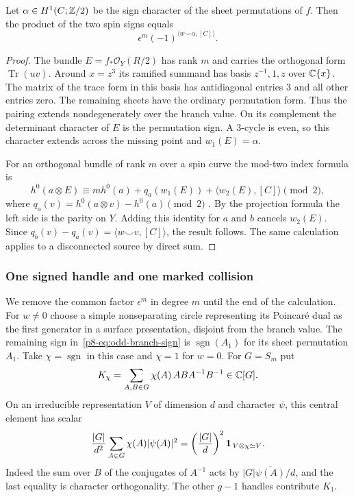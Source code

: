 \begin{lemma}\label{p8-lem:odd-branch-sign}
Let $\alpha\in H^1(C;\mathbb Z/2)$ be the sign character of the sheet
permutations of $f$. Then the product of the two spin signs equals
\begin{equation}
       \epsilon^m(-1)^{\langle w\smile\alpha,[C]\rangle}.
 \label{p8-eq:odd-branch-sign}
\end{equation}
\end{lemma}
\begin{proof}
The bundle $E=f_*\mathcal O_Y(R/2)$ has rank $m$ and carries the
orthogonal form $\operatorname{Tr}(uv)$. Around $x=z^3$ its ramified
summand has basis $z^{-1},1,z$ over $\mathbb C\{x\}$. The matrix of the
trace form in this basis has antidiagonal entries $3$ and all
other entries zero. The remaining sheets have the ordinary
permutation form. Thus the pairing extends nondegenerately over the
branch value. On its complement the determinant character of $E$
is the permutation sign. A 3-cycle is even, so this character
extends across the missing point and $w_1(E)=\alpha$.

For an orthogonal bundle of rank $m$ over a spin curve the
mod-two index formula is
\[
 h^0(a\otimes E)\equiv
 m h^0(a)+q_a(w_1(E))+\langle w_2(E),[C]\rangle\pmod2,
\]
where $q_a(v)=h^0(a\otimes v)-h^0(a)\pmod2$
\cite{ati,baraglia}. By the projection formula the left side is
the parity on $Y$. Adding this identity for $a$ and $b$ cancels
$w_2(E)$. Since $q_b(v)-q_a(v)=\langle w\smile v,[C]\rangle$,
the result follows. The same calculation applies to a disconnected
source by direct sum.
\end{proof}

\subsubsection{One signed handle and one marked collision}
We remove the common factor $\epsilon^m$ in degree $m$ until the
end of the calculation. For $w\ne0$ choose a simple nonseparating
circle representing its Poincar\'e dual as the first generator in a
surface presentation, disjoint from the branch value. The remaining
sign in~\eqref{p8-eq:odd-branch-sign} is $\operatorname{sgn}(A_1)$
for its sheet permutation $A_1$. Take $\chi=\operatorname{sgn}$ in
this case and $\chi=1$ for $w=0$. For $G=S_m$ put
\[
 K_\chi=\sum_{A,B\in G}\chi(A)\,ABA^{-1}B^{-1}\in\mathbb C[G].
\]
On an irreducible representation $V$ of dimension $d$ and character
$\psi$, this central element has scalar
\[
 \frac{|G|}{d^2}\sum_{A\in G}\chi(A)|\psi(A)|^2
  =\left(\frac{|G|}{d}\right)^2
       {\bf1}_{\,V\otimes\chi\simeq V}.
\]
Indeed the sum over $B$ of the conjugates of $A^{-1}$ acts by
$|G|\overline{\psi(A)}/d$, and the last equality is character
orthogonality. The other $g-1$ handles contribute $K_1$.

